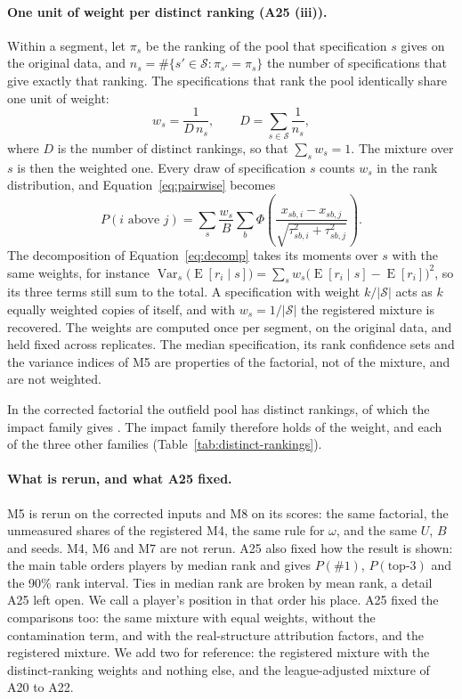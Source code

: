 \documentclass[11pt,a4paper]{article}
\DeclareMathOperator{\Var}{Var}
\DeclareMathOperator{\E}{E}
\begin{document}
\paragraph{One unit of weight per distinct ranking (A25 (iii)).}
Within a segment, let $\pi_s$ be the ranking of the pool that specification
$s$ gives on the original data, and
$n_s = \#\{s' \in \mathcal S : \pi_{s'} = \pi_s\}$ the number of specifications
that give exactly that ranking. The specifications that rank the pool
identically share one unit of weight:
\begin{equation}
  w_s = \frac{1}{D\, n_s},
  \qquad
  D = \sum_{s \in \mathcal S} \frac{1}{n_s},
  \label{eq:weights}
\end{equation}
where $D$ is the number of distinct rankings, so that $\sum_s w_s = 1$. The
mixture over $s$ is then the weighted one. Every draw of specification $s$
counts $w_s$ in the rank distribution, and Equation~\eqref{eq:pairwise} becomes
\begin{equation}
  P(i \text{ above } j) = \sum_{s} \frac{w_s}{B} \sum_{b}
  \Phi\!\left(\frac{x_{sb,i} - x_{sb,j}}{\sqrt{\tau^2_{sb,i} + \tau^2_{sb,j}}}\right).
  \label{eq:pairwise-weighted}
\end{equation}
The decomposition of Equation~\eqref{eq:decomp} takes its moments over $s$
with the same weights, for instance
$\Var_s\big(\E[r_i \mid s]\big) = \sum_s w_s \big(\E[r_i \mid s] - \E[r_i]\big)^2$,
so its three terms still sum to the total. A specification with weight
$k/|\mathcal S|$ acts as $k$ equally weighted copies of itself, and with
$w_s = 1/|\mathcal S|$ the registered mixture is recovered. The weights are
computed once per segment, on the original data, and held fixed across
replicates. The median specification, its rank confidence sets and the
variance indices of M5 are properties of the factorial, not of the mixture,
and are not weighted.

In the corrected factorial the outfield pool has \CorrectedNDistinctOutfield{}
distinct rankings, of which the impact family gives
\CorrectedNDistinctImpact{}. The impact family therefore holds
\CorrectedWeightImpact{} of the weight, and each of the three other families
\CorrectedWeightOtherFamily{} (Table~\ref{tab:distinct-rankings}).

\paragraph{What is rerun, and what A25 fixed.}
M5 is rerun on the corrected inputs and M8 on its scores: the same factorial,
the unmeasured shares of the registered M4, the same rule for $\omega$, and
the same $U$, $B$ and seeds. M4, M6 and M7 are not rerun. A25 also fixed how
the result is shown: the main table orders players by median rank and gives
$P(\#1)$, $P(\text{top-3})$ and the 90\% rank interval. Ties in median rank
are broken by mean rank, a detail A25 left open. We call a player's position
in that order his place. A25 fixed the comparisons too: the same mixture with
equal weights, without the contamination term, and with the real-structure
attribution factors, and the registered mixture. We add two for reference:
the registered mixture with the distinct-ranking weights and nothing else,
and the league-adjusted mixture of A20 to A22.
\end{document}
